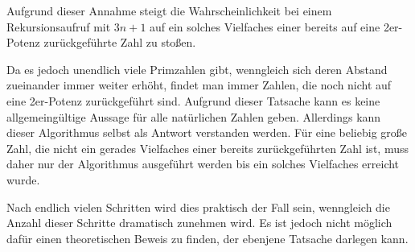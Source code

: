 \documentclass[10pt,a4paper,oneside,ngerman,numbers=noenddot]{scrartcl}
\begin{document}
	Aufgrund dieser Annahme steigt die Wahrscheinlichkeit bei einem Rekursionsaufruf mit $3n+1$ auf ein solches Vielfaches einer bereits auf eine 2er-Potenz zurückgeführte Zahl zu stoßen.
	
	Da es jedoch unendlich viele Primzahlen gibt, wenngleich sich deren Abstand zueinander immer weiter erhöht, findet man immer Zahlen, die noch nicht auf eine 2er-Potenz zurückgeführt sind. Aufgrund dieser Tatsache kann es keine allgemeingültige Aussage für alle natürlichen Zahlen geben. Allerdings kann dieser Algorithmus selbst als Antwort verstanden werden. Für eine beliebig große Zahl, die nicht ein gerades Vielfaches einer bereits zurückgeführten Zahl ist, muss daher nur der Algorithmus ausgeführt werden bis ein solches Vielfaches erreicht wurde.
	
	Nach endlich vielen Schritten wird dies praktisch der Fall sein, wenngleich die Anzahl dieser Schritte dramatisch zunehmen wird. Es ist jedoch nicht möglich dafür einen theoretischen Beweis zu finden, der ebenjene Tatsache darlegen kann.
\end{document}
